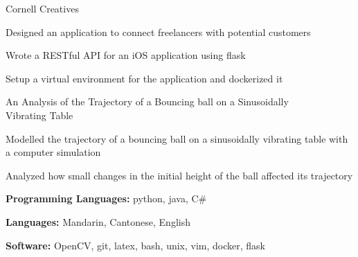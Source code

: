 \documentclass{resume}
\begin{document}
\begin{projects}
    \begin{entryleft}{Cornell Creatives}{}
        \begin{description}
            \item Designed an application to connect freelancers with potential customers
            \item Wrote a RESTful API for an iOS application using flask
            \item Setup a virtual environment for the application and dockerized it
        \end{description}
    \end{entryleft}
    \begin{entryright}
    \end{entryright}

    \begin{entryleft}{An Analysis of the Trajectory of a Bouncing ball on a Sinusoidally \\Vibrating Table}{}
        \begin{description}
            \item Modelled the trajectory of a bouncing ball on a sinusoidally vibrating table with a computer simulation
            \item Analyzed how small changes in the initial height of the ball affected its trajectory
        \end{description}
    \end{entryleft}
    \begin{entryright}
    \end{entryright}
\end{projects}

    \begin{smalldescription}
        \item \textbf{Programming Languages:} python, java, C\#
        \item \textbf{Languages: } Mandarin, Cantonese, English
        \item \textbf{Software:} OpenCV, git, latex, bash, unix, vim, docker, flask
    \end{smalldescription}
\end{document}
